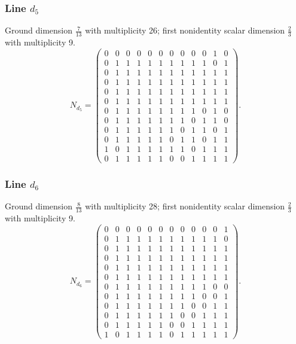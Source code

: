 \subsubsection*{Line $d_{5}$}
\noindent Ground dimension $\frac{7}{13}$ with multiplicity 26; first nonidentity scalar dimension $\frac{2}{3}$ with multiplicity 9.
\[\renewcommand{\arraystretch}{0.93}N_{d_{5}}=\left(\begin{array}{rrrrrrrrrrrr}
0&0&0&0&0&0&0&0&0&0&1&0\\
0&1&1&1&1&1&1&1&1&1&0&1\\
0&1&1&1&1&1&1&1&1&1&1&1\\
0&1&1&1&1&1&1&1&1&1&1&1\\
0&1&1&1&1&1&1&1&1&1&1&1\\
0&1&1&1&1&1&1&1&1&1&1&1\\
0&1&1&1&1&1&1&1&1&0&1&0\\
0&1&1&1&1&1&1&1&0&1&1&0\\
0&1&1&1&1&1&1&0&1&1&0&1\\
0&1&1&1&1&1&0&1&1&0&1&1\\
1&0&1&1&1&1&1&1&0&1&1&1\\
0&1&1&1&1&1&0&0&1&1&1&1
\end{array}\right).\]
\subsubsection*{Line $d_{6}$}
\noindent Ground dimension $\frac{8}{13}$ with multiplicity 28; first nonidentity scalar dimension $\frac{2}{3}$ with multiplicity 9.
\[\renewcommand{\arraystretch}{0.93}N_{d_{6}}=\left(\begin{array}{rrrrrrrrrrrr}
0&0&0&0&0&0&0&0&0&0&0&1\\
0&1&1&1&1&1&1&1&1&1&1&0\\
0&1&1&1&1&1&1&1&1&1&1&1\\
0&1&1&1&1&1&1&1&1&1&1&1\\
0&1&1&1&1&1&1&1&1&1&1&1\\
0&1&1&1&1&1&1&1&1&1&1&1\\
0&1&1&1&1&1&1&1&1&1&0&0\\
0&1&1&1&1&1&1&1&1&0&0&1\\
0&1&1&1&1&1&1&1&0&0&1&1\\
0&1&1&1&1&1&1&0&0&1&1&1\\
0&1&1&1&1&1&0&0&1&1&1&1\\
1&0&1&1&1&1&0&1&1&1&1&1
\end{array}\right).\]
